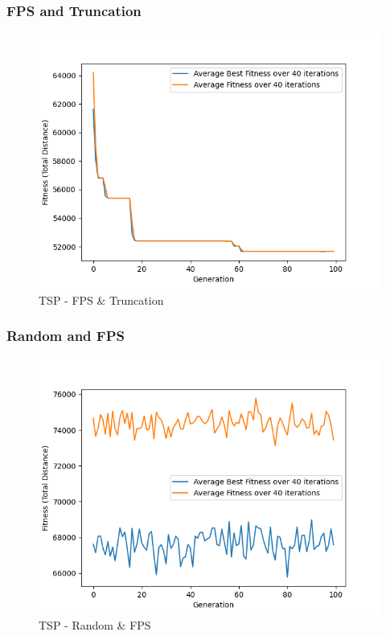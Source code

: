 \documentclass[11pt, letterpaper]{article}
\begin{document}
\subsubsection {FPS and Truncation}
\begin{figure}[H]
    \centering
    \includegraphics[scale = 0.6]{images/tsp_fp_tr.png}
    \caption {TSP - FPS \& Truncation}
    \label {fig:tpsFT}
\end{figure}
\subsubsection {Random and FPS}
\begin{figure}[H]
    \centering
    \includegraphics[scale = 0.6]{images/tsp_rd_fp.png}
    \caption {TSP - Random \& FPS}
    \label {fig:tpsRB}
\end{figure}
\end{document}
